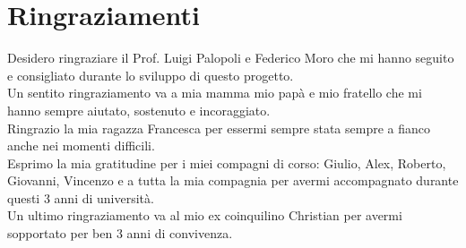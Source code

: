 \chapter*{Ringraziamenti}
\thispagestyle{empty}

Desidero ringraziare il Prof. Luigi Palopoli e Federico Moro che mi hanno seguito e consigliato durante lo sviluppo di questo progetto.\\

Un sentito ringraziamento va a mia mamma mio papà e mio fratello che mi hanno sempre aiutato, sostenuto e incoraggiato.\\

Ringrazio la mia ragazza Francesca per essermi sempre stata sempre a fianco anche nei momenti difficili.\\

Esprimo la mia gratitudine per i miei compagni di corso: Giulio, Alex, Roberto, Giovanni, Vincenzo e a tutta la mia compagnia per avermi accompagnato durante questi 3 anni di università.\\

Un ultimo ringraziamento va al mio ex coinquilino Christian per avermi sopportato per ben 3 anni di convivenza.
